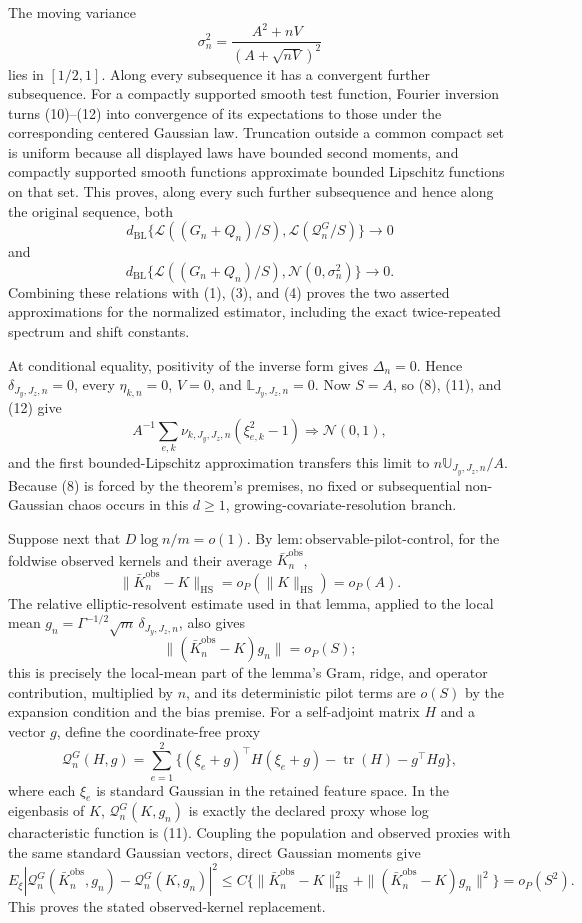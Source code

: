 The moving variance
\[
\sigma_n^2=\frac{A^2+nV}{(A+\sqrt{nV})^2}
\]
lies in \([1/2,1]\).  Along every subsequence it has a convergent further subsequence.  For a compactly supported smooth test function, Fourier inversion turns (10)--(12) into convergence of its expectations to those under the corresponding centered Gaussian law.  Truncation outside a common compact set is uniform because all displayed laws have bounded second moments, and compactly supported smooth functions approximate bounded Lipschitz functions on that set.  This proves, along every such further subsequence and hence along the original sequence, both
\[
d_{\mathrm{BL}}\{\mathcal L((G_n+Q_n)/S),\mathcal L(\mathcal Q_n^G/S)\}\to0
\]
and
\[
d_{\mathrm{BL}}\{\mathcal L((G_n+Q_n)/S),\mathcal N(0,\sigma_n^2)\}\to0.
\]
Combining these relations with (1), (3), and (4) proves the two asserted approximations for the normalized estimator, including the exact twice-repeated spectrum and shift constants.

At conditional equality, positivity of the inverse form gives \(\Delta_n=0\).  Hence \(\delta_{J_y,J_z,n}=0\), every \(\eta_{k,n}=0\), \(V=0\), and \(\mathbb L_{J_y,J_z,n}=0\).  Now \(S=A\), so (8), (11), and (12) give
\[
A^{-1}\sum_{e,k}\nu_{k,J_y,J_z,n}(\xi_{e,k}^2-1)\Rightarrow\mathcal N(0,1),
\]
and the first bounded-Lipschitz approximation transfers this limit to \(n\mathbb U_{J_y,J_z,n}/A\).  Because (8) is forced by the theorem's premises, no fixed or subsequential non-Gaussian chaos occurs in this \(d\ge1\), growing-covariate-resolution branch.

Suppose next that \(D\log n/m=o(1)\).  By \(\mathrm{lem{:}observable\mbox{-}pilot\mbox{-}control}\), for the foldwise observed kernels and their average \(\bar K_n^{\mathrm{obs}}\),
\[
\|\bar K_n^{\mathrm{obs}}-K\|_{\mathrm{HS}}=o_P(\|K\|_{\mathrm{HS}})=o_P(A).
\]
The relative elliptic-resolvent estimate used in that lemma, applied to the local mean \(g_n=\Gamma^{-1/2}\sqrt m\,\delta_{J_y,J_z,n}\), also gives
\[
\|(\bar K_n^{\mathrm{obs}}-K)g_n\|=o_P(S);
\]
this is precisely the local-mean part of the lemma's Gram, ridge, and operator contribution, multiplied by \(n\), and its deterministic pilot terms are \(o(S)\) by the expansion condition and the bias premise.  For a self-adjoint matrix \(H\) and a vector \(g\), define the coordinate-free proxy
\[
\mathcal Q_n^G(H,g)=\sum_{e=1}^2\{(\xi_e+g)^\top H(\xi_e+g)-\operatorname{tr}(H)-g^\top Hg\},
\]
where each \(\xi_e\) is standard Gaussian in the retained feature space.  In the eigenbasis of \(K\), \(\mathcal Q_n^G(K,g_n)\) is exactly the declared proxy whose log characteristic function is (11).  Coupling the population and observed proxies with the same standard Gaussian vectors, direct Gaussian moments give
\[
E_\xi|\mathcal Q_n^G(\bar K_n^{\mathrm{obs}},g_n)-\mathcal Q_n^G(K,g_n)|^2
\le C\{\|\bar K_n^{\mathrm{obs}}-K\|_{\mathrm{HS}}^2
+\|(\bar K_n^{\mathrm{obs}}-K)g_n\|^2\}=o_P(S^2).
\]
This proves the stated observed-kernel replacement.

